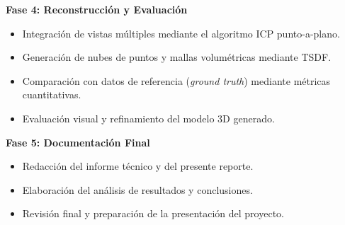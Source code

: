 \documentclass[12pt, a4, twoside, openany]{report}
\begin{document}
\textbf{Fase 4: Reconstrucción y Evaluación}
\begin{itemize}
    \item Integración de vistas múltiples mediante el algoritmo ICP punto-a-plano.
    \item Generación de nubes de puntos y mallas volumétricas mediante TSDF.
    \item Comparación con datos de referencia (\textit{ground truth}) mediante métricas cuantitativas.
    \item Evaluación visual y refinamiento del modelo 3D generado.
\end{itemize}

\textbf{Fase 5: Documentación Final}
\begin{itemize}
    \item Redacción del informe técnico y del presente reporte.
    \item Elaboración del análisis de resultados y conclusiones.
    \item Revisión final y preparación de la presentación del proyecto.
\end{itemize}


\nocite{*} 
\printbibliography[title = \textbf{Referencias}]
\end{document}
